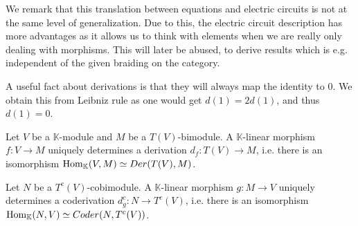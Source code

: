 \documentclass[../thesis.tex]{subfiles}
\begin{document}
\begin{definition}
\begin{center}
                \end{center}
            \end{definition}

            We remark that this translation between equations and electric circuits is not at the same level of generalization. Due to this, the electric circuit description has more advantages as it allows us to think with elements when we are really only dealing with morphisms. This will later be abused, to derive results which is e.g. independent of the given braiding on the category.

            A useful fact about derivations is that they will always map the identity to $0$. We obtain this from Leibniz rule as one would get $d(1) = 2d(1)$, and thus $d(1) = 0$.

            \begin{proposition}\label{prop: tensor-derivation}
                Let $V$ be a $\mathbb{K}$-module and $M$ be a $T(V)$-bimodule. A $\mathbb{K}$-linear morphism $f:V\rightarrow M$ uniquely determines a derivation $d_f:T(V)\rightarrow M$, i.e. there is an isomorphism $\tt{Hom}_{\mathbb{K}}(V,M)\simeq Der(T(V),M)$.


                Let $N$ be a $T^c(V)$-cobimodule. A $\mathbb{K}$-linear morphism $g:M\rightarrow V$ uniquely determines a coderivation $d_g^c:N\rightarrow T^c(V)$, i.e. there is an isomorphism $\tt{Hom}_{\mathbb{K}}(N,V)\simeq Coder(N,T^c(V))$.
            \end{proposition}
\end{document}
